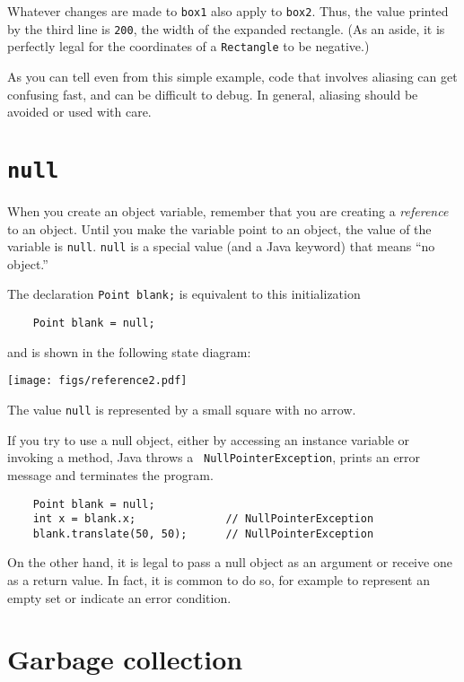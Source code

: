 \documentclass[12pt]{book}
\theoremstyle{definition}
\begin{document}
Whatever changes are
made to {\tt box1} also apply to {\tt box2}.  Thus, the
value printed by the third line is {\tt 200}, the width of
the expanded rectangle. (As an aside, it is perfectly legal
for the coordinates of a {\tt Rectangle} to be negative.)

As you can tell even from this simple example, code that
involves aliasing can get confusing fast, and can be
difficult to debug.  In general, aliasing should be avoided
or used with care.


\section {{\tt null}}

When you create an object variable, remember that you are
creating a {\em reference} to an object.  Until you make
the variable point to an object, the value of the variable
is {\tt null}.  {\tt null} is a special value (and
a Java keyword) that means ``no object.''

The declaration {\tt Point blank;} is equivalent to this
initialization

\begin{lstlisting}
    Point blank = null;
\end{lstlisting}
%
and is shown in the following state diagram:


\texttt{[image: figs/reference2.pdf]}


The value {\tt null} is represented by a small square with no arrow.


If you try to use a null object, either by accessing an instance
variable or invoking a method, Java throws a {\tt
NullPointerException}, prints an error message
and terminates the program.

\begin{lstlisting}
    Point blank = null;
    int x = blank.x;              // NullPointerException
    blank.translate(50, 50);      // NullPointerException
\end{lstlisting}
%
On the other hand, it is legal to pass a null object as an argument or
receive one as a return value.  In fact, it is common to do so, for
example to represent an empty set or indicate an error condition.


\section {Garbage collection}
\end{document}

